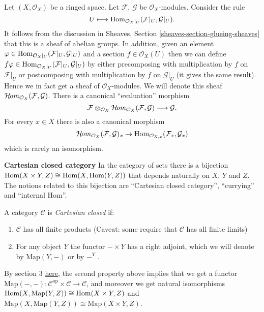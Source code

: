 Let $(X, \mathcal{O}_X)$ be a ringed space.
Let $\mathcal{F}$, $\mathcal{G}$ be $\mathcal{O}_X$-modules.
Consider the rule
$$
U \longmapsto \mathop{\mathrm{Hom}}\nolimits_{\mathcal{O}_X|_U}(\mathcal{F}|_U, \mathcal{G}|_U).
$$
It follows from the discussion in Sheaves, Section
\ref{sheaves-section-glueing-sheaves} that this is a sheaf of
abelian groups. In addition, given an element
$\varphi \in \mathop{\mathrm{Hom}}\nolimits_{\mathcal{O}_X|_U}(\mathcal{F}|_U, \mathcal{G}|_U)$
and a section $f \in \mathcal{O}_X(U)$ then we can define
$f\varphi \in \mathop{\mathrm{Hom}}\nolimits_{\mathcal{O}_X|_U}(\mathcal{F}|_U, \mathcal{G}|_U)$
by either precomposing with multiplication by $f$ on $\mathcal{F}|_U$
or postcomposing with multiplication by $f$ on $\mathcal{G}|_U$ (it gives
the same result). Hence we in fact get a sheaf of $\mathcal{O}_X$-modules.
We will denote this sheaf
$\mathop{\mathcal{H}\!\mathit{om}}\nolimits_{\mathcal{O}_X}(\mathcal{F}, \mathcal{G})$.
There is a canonical ``evaluation'' morphism
$$
\mathcal{F}
\otimes_{\mathcal{O}_X}
\mathop{\mathcal{H}\!\mathit{om}}\nolimits_{\mathcal{O}_X}(\mathcal{F}, \mathcal{G})
\longrightarrow
\mathcal{G}.
$$
For every $x \in X$ there is also a canonical morphism
$$
\mathop{\mathcal{H}\!\mathit{om}}\nolimits_{\mathcal{O}_X}(\mathcal{F}, \mathcal{G})_x
\to
\mathop{\mathrm{Hom}}\nolimits_{\mathcal{O}_{X, x}}(\mathcal{F}_x, \mathcal{G}_x)
$$
which is rarely an isomorphism.

\medskip\noindent
{\bf Cartesian closed category} In the category of sets there is a bijection
$\mathop{\mathrm{Hom}}\nolimits(X\times Y, Z)\cong \mathop{\mathrm{Hom}}\nolimits(X, \text{Hom}(Y, Z))$ that depends
naturally on $X$, $Y$ and $Z$. The notions related to this bijection are
“Cartesian closed category”, “currying” and “internal Hom”.

\begin{definition}
\label{definition-Cartesian-closed-category}
A category $\mathcal{C}$ is {\it Cartesian closed} if:
\begin{enumerate}
\item $\mathcal{C}$ has all finite products 
(Caveat: some require that $\mathcal{C}$ has all finite limits)
\item For any object $Y$ the functor $- \times Y$ has a right adjoint,
which we will denote by $\text{Map}(Y,-)$ or by $-^Y$ .
\end{enumerate}
\end{definition}

\begin{remark}
\label{remark-currying}
By section 3 \href{https://ncatlab.org/nlab/show/internal+hom }{here}, the
second property above implies that we get a functor 
$\text{Map}(-,-) :\mathcal{C}^{\text{op}} \times \mathcal{C} \to \mathcal{C}$,
and moreover we get natural isomorphisms 
$\mathop{\mathrm{Hom}}\nolimits(X, \text{Map}(Y, Z)) \cong \mathop{\mathrm{Hom}}\nolimits(X \times Y, Z)$
and $\text{Map}(X, \text{Map}(Y, Z))\cong \text{Map}(X \times Y, Z)$.
\end{remark}










